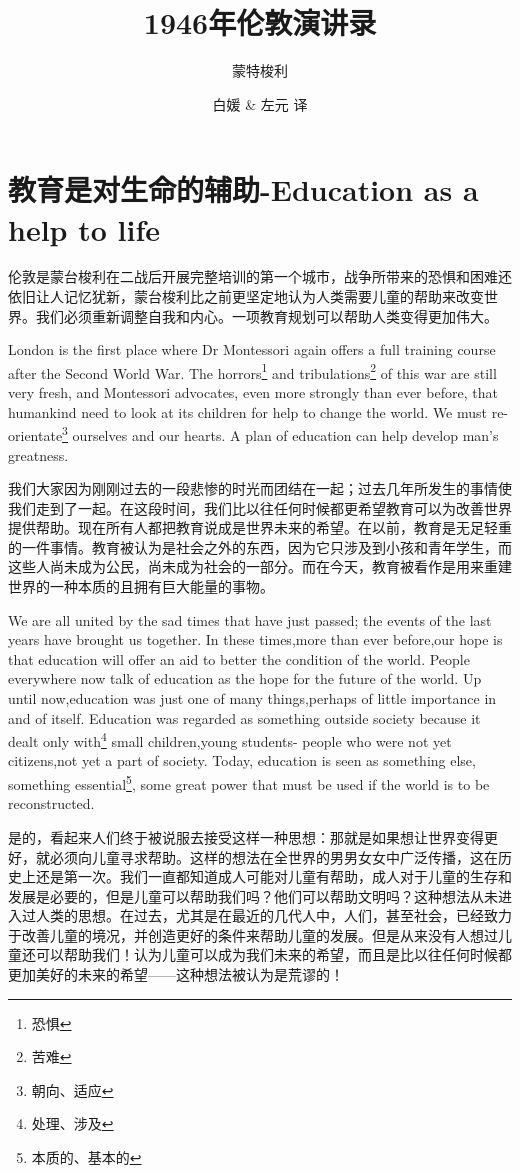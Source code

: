 \documentclass[lang=cn,10pt]{elegantbook}
\title{1946年伦敦演讲录}
\subtitle{蒙特梭利}
\author{白媛 \& 左元 译}
\begin{document}
\maketitle
\frontmatter

\tableofcontents

\mainmatter

\chapter{教育是对生命的辅助-Education as a help to life}

伦敦是蒙台梭利在二战后开展完整培训的第一个城市，战争所带来的恐惧和困难还依旧让人记忆犹新，蒙台梭利比之前更坚定地认为人类需要儿童的帮助来改变世界。我们必须重新调整自我和内心。一项教育规划可以帮助人类变得更加伟大。

London is the first place where Dr Montessori again offers a full training course after the Second World War. The horrors\footnote{恐惧} and tribulations\footnote{苦难} of this war are still very fresh, and Montessori advocates, even more strongly than ever before, that humankind need to look at its children for help to change the world. We must re-orientate\footnote{朝向、适应} ourselves and our hearts. A plan of education can help develop man's greatness.

我们大家因为刚刚过去的一段悲惨的时光而团结在一起；过去几年所发生的事情使我们走到了一起。在这段时间，我们比以往任何时候都更希望教育可以为改善世界提供帮助。现在所有人都把教育说成是世界未来的希望。在以前，教育是无足轻重的一件事情。教育被认为是社会之外的东西，因为它只涉及到小孩和青年学生，而这些人尚未成为公民，尚未成为社会的一部分。而在今天，教育被看作是用来重建世界的一种本质的且拥有巨大能量的事物。

We are all united by the sad times that have just passed; the events of the last years have brought us together. In these times,more than ever before,our hope is that education will offer an aid to better the condition of the world. People everywhere now talk of education as the hope for the future of the world. Up until now,education was just one of many things,perhaps of little importance in and of itself. Education was regarded as something outside society because it dealt only with\footnote{处理、涉及} small children,young students- people who were not yet citizens,not yet a part of society. Today, education is seen as something else, something essential\footnote{本质的、基本的}, some great power that must be used if the world is to be reconstructed.

是的，看起来人们终于被说服去接受这样一种思想：那就是如果想让世界变得更好，就必须向儿童寻求帮助。这样的想法在全世界的男男女女中广泛传播，这在历史上还是第一次。我们一直都知道成人可能对儿童有帮助，成人对于儿童的生存和发展是必要的，但是儿童可以帮助我们吗？他们可以帮助文明吗？这种想法从未进入过人类的思想。在过去，尤其是在最近的几代人中，人们，甚至社会，已经致力于改善儿童的境况，并创造更好的条件来帮助儿童的发展。但是从来没有人想过儿童还可以帮助我们！认为儿童可以成为我们未来的希望，而且是比以往任何时候都更加美好的未来的希望——这种想法被认为是荒谬的！
\end{document}
